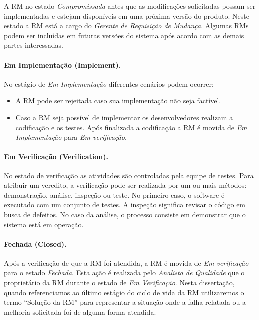 A RM no estado \textit{Compromissada} antes que as modificações solicitadas
possam ser implementadas e estejam disponíveis em uma próxima versão do produto.
Neste estado a RM está a cargo do \textit{Gerente de Requisição de Mudança}.
Algumas RMs podem ser incluídas em futuras versões do sistema após acordo com
as demais partes interessadas.

\paragraph{Em Implementação (Implement).}
\label{par:em_implementacao}

No estágio de \textit{Em Implementação} diferentes cenários podem ocorrer:

\begin{itemize}
	\item A RM pode ser rejeitada caso sua implementação não seja factível.
	\item Caso a RM seja possível de implementar os desenvolvedores realizam a
		codificação e os testes. Após finalizada a codificação a RM é movida de
		\textit{Em Implementação} para \textit{Em verificação}.
\end{itemize}

\paragraph{Em Verificação (Verification).}
\label{par:em_verificacao}

No estado de verificação as atividades são controladas pela equipe de testes.
Para atribuir um veredito, a verificação pode ser realizada por um ou mais
métodos: demonstração, análise, inspeção ou teste. No primeiro caso, o software
é executado com um conjunto de testes. A inspeção significa revisar o código em
busca de defeitos. No caso da análise, o processo consiste em demonstrar que o
sistema está em operação.

\paragraph{Fechada (Closed).}
\label{par:fechada}

Após a verificação de que a RM foi atendida, a RM é movida de \textit{Em
	verificação} para o estado \textit{Fechada}. Esta ação é realizada pelo
\textit{Analista de Qualidade} que o proprietário da RM durante o estado de
\textit{Em Verificação}. Nesta dissertação, quando referenciamos ao último
estágio do ciclo de vida da RM utilizaremos o termo ``Solução da RM'' para
representar a situação onde a falha relatada ou a melhoria solicitada foi de
alguma forma atendida.


